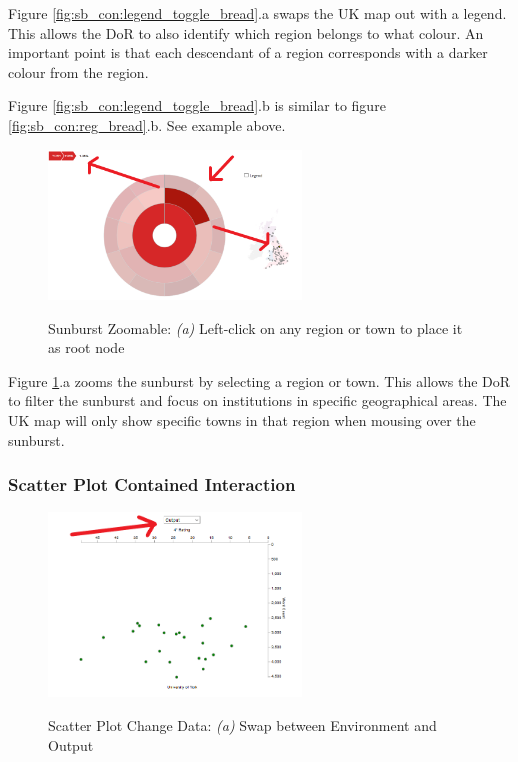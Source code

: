 \documentclass[a4paper, 11pt]{article}
\begin{document}
\noindent Figure \ref{fig:sb_con:legend_toggle_bread}.a swaps the UK map out with a legend. This allows the DoR to also identify which region belongs to what colour. An important point is that each descendant of a region corresponds with a darker colour from the region.

\noindent Figure \ref{fig:sb_con:legend_toggle_bread}.b is similar to figure \ref{fig:sb_con:reg_bread}.b. See example above.



\begin{figure}[hbt!]
	\centering
      \includegraphics[width=0.6\textwidth]{imgs/sb_int/zoomable_sb.png} \\
	\caption{Sunburst Zoomable: 
	\textit{(a)} Left-click on any region or town to place it as root node}
    \label{fig:sb_con:zoomable_sb}
     \noindent\makebox[\linewidth]{\rule{\textwidth}{0.4pt}}
\end{figure}

\noindent Figure \ref{fig:sb_con:zoomable_sb}.a zooms the sunburst by selecting a region or town. This allows the DoR to filter the sunburst and focus on institutions in specific geographical areas. The UK map will only show specific towns in that region when mousing over the sunburst.

\newpage
\subsubsection{Scatter Plot Contained Interaction}
\begin{figure}[hbt!]
	\centering
      \includegraphics[width=0.6\textwidth]{imgs/sp_int/change_data.png} \\
	\caption{Scatter Plot Change Data: 
	\textit{(a)} Swap between Environment and Output}
    \label{fig:sp_con:swap_data}
     \noindent\makebox[\linewidth]{\rule{\textwidth}{0.4pt}}
\end{figure}
\end{document}
